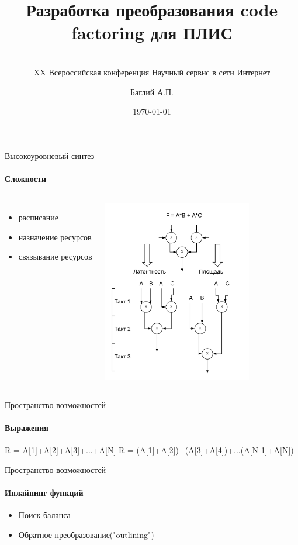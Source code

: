 \documentclass{beamer}              %
\title{Разработка преобразования code factoring для ПЛИС}
\subtitle{\\ XX Всероссийская конференция Научный сервис в сети Интернет}
\date{\today}
\author{Баглий А.П.}
\institute{Южный федеральный университет}
\begin{document}
\maketitle




\begin{frame}{Высокоуровневый синтез}
  \framesubtitle{Сложности}
  
  \begin{columns}
      \begin{itemize}
         \item расписание
          \item назначение ресурсов
          \item связывание ресурсов
  		\end{itemize}

      \begin{block}{}
         \includegraphics[height=8cm]{img/HLSCompromise.png}
      \end{block}
  \end{columns}	
  
  
\end{frame}

\begin{frame}{Пространство возможностей}
  \framesubtitle{Выражения}
  R = A[1]+A[2]+A[3]+...+A[N]
  R = (A[1]+A[2])+(A[3]+A[4])+...(A[N-1]+A[N])
\end{frame}

\begin{frame}{Пространство возможностей}
  \framesubtitle{Инлайнинг функций}
  \begin{itemize}
      \item Поиск баланса
      \item Обратное преобразование("outlining")
  \end{itemize}
  
\end{frame}
\end{document}
